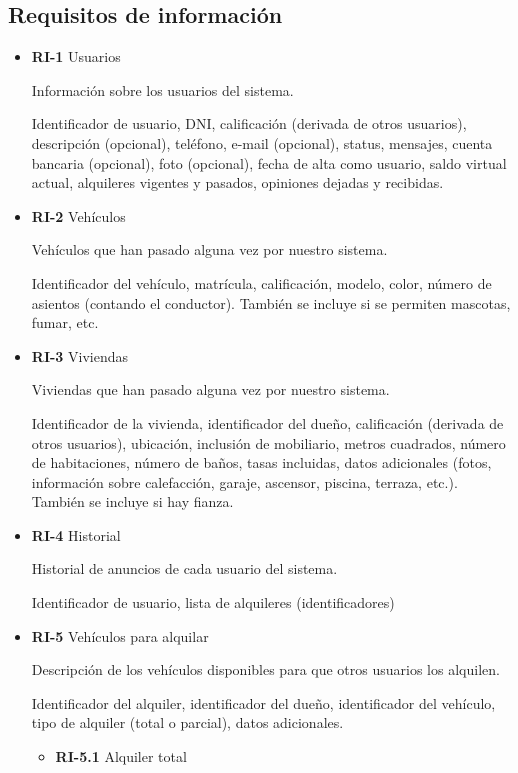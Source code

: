 \documentclass[11pt,spanish]{article} %
\begin{document}
\subsection{Requisitos de información}
\begin{itemize}
	\item \textbf{RI-1} Usuarios

	Información sobre los usuarios del sistema.

	Identificador de usuario, DNI, calificación (derivada de otros usuarios), descripción (opcional), teléfono, e-mail (opcional), status, mensajes, cuenta bancaria (opcional), foto (opcional), fecha de alta como usuario, saldo virtual actual, alquileres vigentes y pasados, opiniones dejadas y recibidas.

	\item \textbf{RI-2} Vehículos

	Vehículos que han pasado alguna vez por nuestro sistema.

	Identificador del vehículo, matrícula, calificación, modelo, color, número de asientos (contando el conductor).
	También se incluye si se permiten mascotas, fumar, etc.

	\item \textbf{RI-3} Viviendas

	Viviendas que han pasado alguna vez por nuestro sistema.

	Identificador de la vivienda, identificador del dueño, calificación (derivada de otros usuarios), ubicación, inclusión de mobiliario, metros cuadrados, número de habitaciones, número de baños, tasas incluidas, datos adicionales (fotos, información sobre calefacción, garaje, ascensor, piscina, terraza, etc.).
	También se incluye si hay fianza.

	\item \textbf{RI-4} Historial

	Historial de anuncios de cada usuario del sistema.

	Identificador de usuario, lista de alquileres (identificadores)

	\item \textbf{RI-5} Vehículos para alquilar

	Descripción de los vehículos disponibles para que otros usuarios los alquilen.

	Identificador del alquiler, identificador del dueño, identificador del vehículo, tipo de alquiler (total o parcial), datos adicionales.
	\begin{itemize}
		\item \textbf{RI-5.1} Alquiler total


\end{itemize}
\end{itemize}
\end{document}
